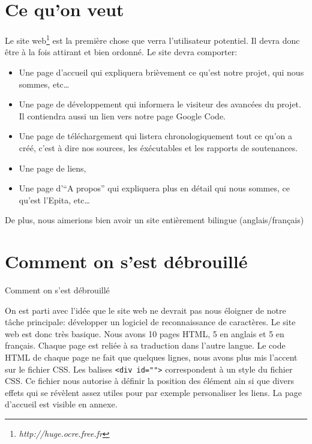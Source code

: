 \documentclass[]{report}
\begin{document}
		\section{Ce qu'on veut} %
		\label{sec:ce_qu_on_veut}
		Le site web\footnote{\emph{http://huge.ocre.free.fr}} est la premi\`ere chose que verra l'utilisateur potentiel. Il devra donc \^etre \`a la fois attirant et bien ordonn\'e. Le site devra comporter:
		\begin{itemize}
			\item Une page d'accueil qui expliquera bri\`evement ce qu'est notre projet, qui nous sommes, etc\ldots
			\item Une page de d\'eveloppement qui informera le visiteur des avanc\'ees du projet. Il contiendra aussi un lien vers notre page Google Code.
			\item Une page de t\'el\'echargement qui listera chronologiquement tout ce qu'on a cr\'e\'e, c'est \`a dire nos sources, les \'ex\'ecutables et les rapports de soutenances.
			\item Une page de liens,
			\item Une page d'``A propos'' qui expliquera plus en d\'etail qui nous sommes, ce qu'est l'Epita, etc\ldots
		\end{itemize}
		De plus, nous aimerions bien avoir un site enti\`erement bilingue (anglais/fran\c cais)
		\section{Comment on s'est d\'ebrouill\'e} %
		\label{sec:comment_on_s_est_d'ebrouill'e}
		Comment on s'est débrouillé

			On est parti avec l'idée que le site web ne devrait pas nous éloigner de notre tâche principale: développer un logiciel de reconnaissance de caractères. Le site web est donc tr\`es basique. Nous avons 10 pages HTML, 5 en anglais et 5 en fran\c cais. Chaque page est reli\'ee \`a sa traduction dans l'autre langue. 
			Le code HTML de chaque page ne fait que quelques lignes, nous avons plus mis l'accent sur le fichier CSS. Les balises \verb!<div id="">! correspondent \`a un style du fichier CSS. Ce fichier nous autorise \`a d\'efinir la position des \'el\'ement ain si que divers effets qui se r\'ev\`elent assez utiles pour par exemple personaliser les liens.
			La page d'accueil est visible en annexe.
			 

\end{document}
